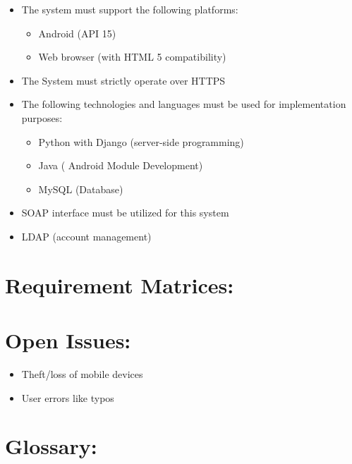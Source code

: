 \documentclass[12pt]{article}
\begin{document}
		\begin{itemize}
			\item The system must support the following platforms: 
				\begin{itemize}
					\item Android (API 15)
					\item Web browser (with HTML 5 compatibility)
				\end{itemize}
				
			\item The System must strictly operate over HTTPS
			\item The following technologies and languages must be used for implementation purposes:
				\begin{itemize}
					\item Python with Django (server-side programming)
					\item Java ( Android Module Development)
					\item MySQL (Database)
				\end{itemize}
				\item SOAP interface must be utilized for this system
				\item LDAP (account management)
		\end{itemize}
	
	\vspace{0.5in}
	
	\newpage
	\section{Requirement Matrices:}
	\vspace{0.2in}
	
	
	
	\vspace{0.5in}
	
	\section{Open Issues:} %
	\vspace{0.2in}
	
	\begin{itemize}
		\item Theft/loss of mobile devices
		\item User errors like typos
	\end{itemize}
	
	
	\vspace{0.5in}
	
	\section{Glossary:}
	\vspace{0.2in}
		
	
	\vspace{0.5in}
		
\end{document}
